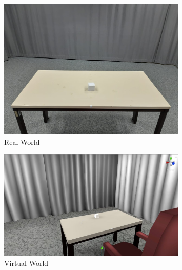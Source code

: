 \begin{figure}[h]
    \centering
    \includegraphics[width=0.8\textwidth]{./images/fig5.jpeg}
    \caption{Real World}
    \label{fig:fig5}
\end{figure}
\begin{figure}[h]
    \centering
    \includegraphics[width=0.8\textwidth]{./images/fig51.jpeg}
    \caption{Virtual World}
    \label{fig:fig51}
\end{figure}
